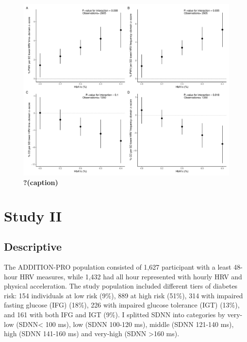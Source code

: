 \documentclass[
  a4paper,
  headsepline=true,
  open=any]{scrbook}
\begin{document}
\begin{figure}

{\centering \includegraphics{images/em_hba1c.pdf}

}

\caption{\label{fig-MS-HRV}\textbf{?(caption)}}

\end{figure}

\hypertarget{study-ii}{%
\section{Study II}\label{study-ii}}

\hypertarget{descriptive-1}{%
\subsection{Descriptive}\label{descriptive-1}}

The ADDITION-PRO population consisted of 1,627 participant with a least
48-hour HRV measures, while 1,432 had all hour represented with hourly
HRV and physical acceleration. The study population included different
tiers of diabetes risk: 154 individuals at low risk (9\%), 889 at high
risk (51\%), 314 with impaired fasting glucose (IFG) (18\%), 226 with
impaired glucose tolerance (IGT) (13\%), and 161 with both IFG and IGT
(9\%). I splitted SDNN into categories by very-low (SDNN\textless{} 100
ms), low (SDNN 100-120 ms), middle (SDNN 121-140 ms), high (SDNN 141-160
ms) and very-high (SDNN \textgreater160 ms).
\end{document}
